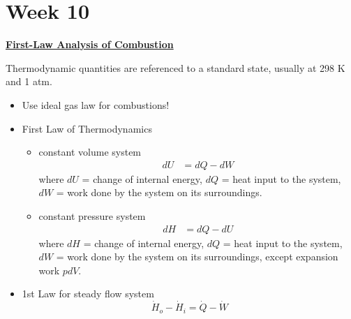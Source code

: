 \section{Week 10}
{\Large \textbf{{\color{red}\underline{First-Law Analysis of Combustion}}}}



Thermodynamic quantities are referenced to a standard state, usually at 298 K and 1 atm.

\begin{itemize}
    \item Use ideal gas law for combustions!
    \item First Law of Thermodynamics
    \begin{itemize}
        \item constant volume system
        \begin{align*}
            dU &= dQ - dW
        \end{align*}
        where $dU$ = change of internal energy, $dQ$ = heat input to the system, $dW$ = work done by the system on its surroundings.
        \item constant pressure system
        \begin{align*}
            dH &= dQ - dU
        \end{align*}
        where $dH$ = change of internal energy, $dQ$ = heat input to the system, $dW$ = work done by the system on its surroundings, except expansion work $pdV$.
    \end{itemize}
    
    \item 1st Law for steady flow system
    \begin{equation*}
        \dot{H}_o - \dot{H}_i = \dot{Q} - \dot{W}
    \end{equation*}
\end{itemize}

